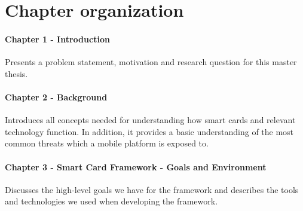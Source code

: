 

\section{Chapter organization}
\paragraph{Chapter 1 - Introduction}
Presents a problem statement, motivation and research question for this master thesis.

\paragraph{Chapter 2 - Background}
Introduces all concepts needed for understanding how smart cards and relevant technology function. In addition, it provides a basic understanding of the most common threats which a mobile platform is exposed to.

\paragraph{Chapter 3 - Smart Card Framework - Goals and Environment}
Discusses the high-level goals we have for the framework and describes the tools and technologies we used when developing the framework.

